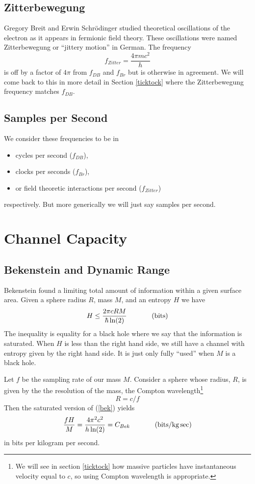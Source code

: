 \documentclass[12pt,a4paper]{article}
\begin{document}
\subsection{Zitterbewegung}
Gregory Breit and Erwin Schrödinger studied theoretical oscillations of the electron as it appears in fermionic field theory.  These oscillations were named Zitterbewegung or ``jittery motion'' in German.  The frequency 
\[
 f_{Zitter} = \frac{4 \pi mc^2}{h}
 \]
is off by a factor of $4 \pi$ from $f_{DB}$ and $f_{Br}$ but is otherwise in agreement.  We will come back to this in more detail in Section \ref{ticktock} where the Zitterbewegung frequency matches $f_{DB}$.

\subsection{Samples per Second}
We consider these frequencies to be in
\begin{itemize}
 \item cycles per second ($f_{DB}$),
 \item clocks per seconds ($f_{Br}$),
 \item or field theoretic interactions per second ($f_{Zitter}$)
\end{itemize}
respectively.  But more generically we will just say samples per second. 

\section{Channel Capacity}
\subsection{Bekenstein and Dynamic Range}
Bekenstein found a limiting total amount of information within a given surface area.  Given a sphere radius $R$,  mass $M$, and an entropy $H$ we have
\begin{equation}
\label{bek}
  H \le \frac{2 \pi c R M}{\hbar \ln(2)} \hspace{0.5 in} (\si[per-mode=symbol]{bits})
\end{equation}
The inequality is equality for a black hole where we say that the information is saturated.  When $H$ is less than the right hand side, we still have a channel with entropy given by the right hand side.  It is just only fully ``used'' when $M$ is a black hole.

Let $f$ be the sampling rate of our mass $M$.  Consider a sphere whose radius, $R$, is given by the  the resolution of the mass, the Compton wavelength\footnote{We will see in section \ref{ticktock} how massive particles have instantaneous velocity equal to $c$, so using Compton wavelength is appropriate.}
\[
  R=c/f  
\]
Then the saturated version of (\ref{bek}) yields
\[
 \frac{fH}{M} = \frac{4 \pi^2 c^2}{h \ln(2)} = C_{Bek} \hspace{0.5 in} (\si[per-mode=symbol]{bits\per\kilogram.\sec})
\]
in bits per kilogram per second.
\end{document}
